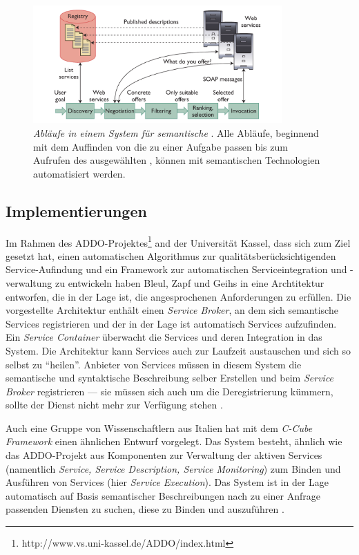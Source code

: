 \begin{figure}[ht]
\centering
\parbox{0.85\textwidth}{
    \includegraphics[width=0.85\textwidth]{media/semantic-ws-client-system.png}
    \caption{\emph{Abläufe in einem System für semantische \wss} \cite[S.64]{ky-sawsdl}. Alle Abläufe, beginnend mit dem Auffinden von \wss die zu einer Aufgabe passen bis zum Aufrufen des ausgewählten \ws , können mit semantischen Technologien automatisiert werden.}
    \label{f:swcs}
}
\end{figure}

\subsection{Implementierungen}

Im Rahmen des \ac{ADDO}-Projektes\footnote{http://www.vs.uni-kassel.de/ADDO/index.html} and der Universität Kassel, dass sich zum Ziel gesetzt hat, einen automatischen Algorithmus zur qualitätsberücksichtigenden Service-Aufindung und ein Framework zur automatischen Serviceintegration und -verwaltung zu entwickeln haben Bleul, Zapf und Geihs in \cite[S.410ff]{flexbrok} eine Archtitektur entworfen, die in der Lage ist, die angesprochenen Anforderungen zu erfüllen. Die vorgestellte Architektur enthält einen \emph{Service Broker}, an dem sich semantische Services registrieren und der in der Lage ist automatisch Services aufzufinden. Ein \emph{Service Container} überwacht die Services und deren Integration in das System. Die Architektur kann Services auch zur Laufzeit austauschen und sich so selbst zu "`heilen"'. Anbieter von Services müssen in diesem System die semantische und syntaktische Beschreibung selber Erstellen und beim \emph{Service Broker} registrieren --- sie müssen sich auch um die Deregistrierung kümmern, sollte der Dienst nicht mehr zur Verfügung stehen \cite[S.416]{flexbrok}.

Auch eine Gruppe von Wissenschaftlern aus Italien hat mit dem \emph{C-Cube Framework}\cite{ccube} einen ähnlichen Entwurf vorgelegt. Das System besteht, ähnlich wie das \ac{ADDO}-Projekt aus Komponenten zur Verwaltung der aktiven Services (namentlich \emph{Service, Service Description, Service Monitoring}) zum Binden und Ausführen von Services (hier \emph{Service Execution}). Das System ist in der Lage automatisch auf Basis semantischer Beschreibungen nach zu einer Anfrage passenden Diensten zu suchen, diese zu Binden und auszuführen \cite[S.4]{ccube}.

